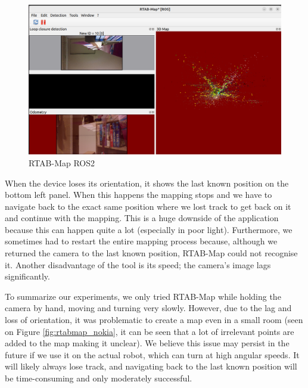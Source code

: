 \begin{figure}[H]
	\centering
	\includegraphics[width=150mm, keepaspectratio]{figures/rtabmap_ros.png}
	\caption{RTAB-Map ROS2}
	\label{fig:rtabmap_ros}
\end{figure}

When the device loses its orientation, it shows the last known position on the bottom left panel. When this happens the mapping stops and we have to navigate back to the exact same position where we lost track to get back on it and continue with the mapping. This is a huge downside of the application because this can happen quite a lot (especially in poor light). Furthermore, we sometimes had to restart the entire mapping process because, although we returned the camera to the last known position, RTAB-Map could not recognise it. Another disadvantage of the tool is its speed; the camera's image lags significantly.

To summarize our experiments, we only tried RTAB-Map while holding the camera by hand, moving and turning very slowly. However, due to the lag and loss of orientation, it was problematic to create a map even in a small room (seen on Figure \ref{fig:rtabmap_nokia}, it can be seen that a lot of irrelevant points are added to the map making it unclear). We believe this issue may persist in the future if we use it on the actual robot, which can turn at high angular speeds. It will likely always lose track, and navigating back to the last known position will be time-consuming and only moderately successful.

